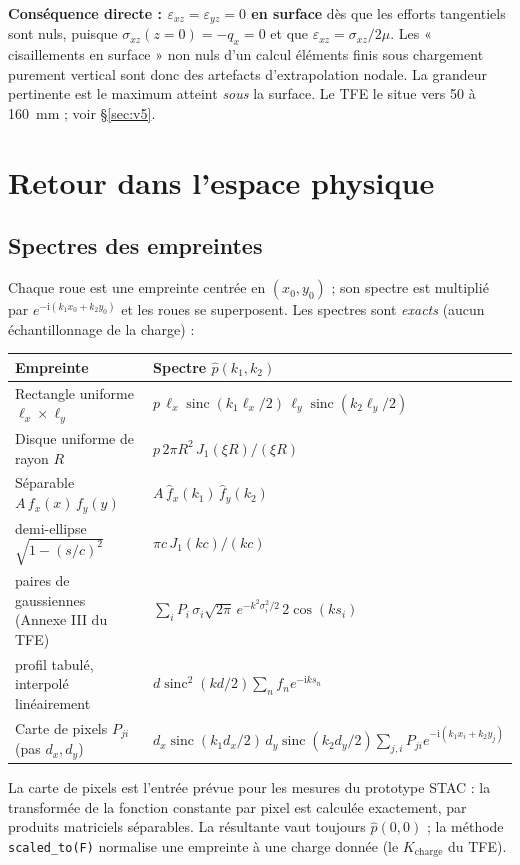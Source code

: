 \documentclass[11pt,a4paper]{article}
\newcommand{\ii}{\mathrm{i}}
\newcommand{\hatt}[1]{\widehat{#1}}
\renewcommand{\epsilon}{\varepsilon}
\begin{document}
\begin{encadre}
\textbf{Conséquence directe : $\epsilon_{xz}=\epsilon_{yz}=0$ en surface} dès que les efforts
tangentiels sont nuls, puisque $\sigma_{xz}(z=0)=-q_x=0$ et que $\epsilon_{xz}=\sigma_{xz}/2\mu$.
Les « cisaillements en surface » non nuls d'un calcul éléments finis sous chargement purement
vertical sont donc des artefacts d'extrapolation nodale. La grandeur pertinente est le maximum
atteint \emph{sous} la surface. Le TFE le situe vers 50 à \SI{160}{mm} ; voir \S\ref{sec:v5}.
\end{encadre}

\section{Retour dans l'espace physique}
\subsection{Spectres des empreintes}\label{sec:empreintes}
Chaque roue est une empreinte centrée en $(x_0,y_0)$ ; son spectre est multiplié par
$e^{-\ii(k_1x_0+k_2y_0)}$ et les roues se superposent. Les spectres sont \emph{exacts} (aucun
échantillonnage de la charge) :
\begin{center}\small
\begin{tabular}{p{4.3cm}p{9.6cm}}
\toprule
Empreinte & Spectre $\hatt p(k_1,k_2)$\\
\midrule
Rectangle uniforme $\ell_x\times\ell_y$ & $p\,\ell_x\operatorname{sinc}(k_1\ell_x/2)\,\ell_y\operatorname{sinc}(k_2\ell_y/2)$\\
Disque uniforme de rayon $R$ & $p\,2\pi R^2\,J_1(\xi R)/(\xi R)$\\
Séparable $A\,f_x(x)\,f_y(y)$ & $A\,\hatt f_x(k_1)\,\hatt f_y(k_2)$\\
\quad demi-ellipse $\sqrt{1-(s/c)^2}$ & $\pi c\,J_1(kc)/(kc)$\\
\quad paires de gaussiennes (Annexe III du TFE) & $\sum_iP_i\,\sigma_i\sqrt{2\pi}\,e^{-k^2\sigma_i^2/2}\,2\cos(k s_i)$\\
\quad profil tabulé, interpolé linéairement & $d\operatorname{sinc}^2(kd/2)\sum_nf_n e^{-\ii ks_n}$\\
Carte de pixels $P_{ji}$ (pas $d_x,d_y$) & $d_x\operatorname{sinc}(k_1d_x/2)\,d_y\operatorname{sinc}(k_2d_y/2)\sum_{j,i}P_{ji}e^{-\ii(k_1x_i+k_2y_j)}$\\
\bottomrule
\end{tabular}
\end{center}
La carte de pixels est l'entrée prévue pour les mesures du prototype STAC : la transformée de la
fonction constante par pixel est calculée exactement, par produits matriciels séparables.
La résultante vaut toujours $\hatt p(0,0)$ ; la méthode \texttt{scaled\_to(F)} normalise une
empreinte à une charge donnée (le $K_{\text{charge}}$ du TFE).
\end{document}
